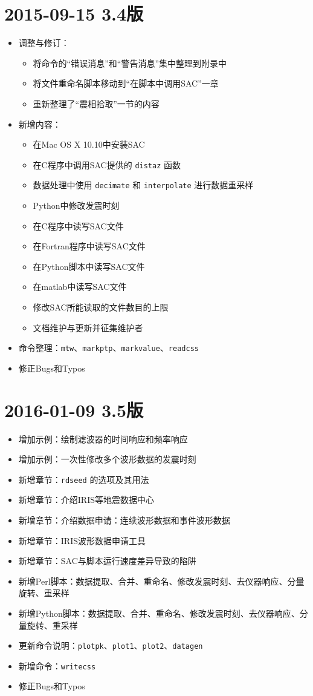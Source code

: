 \section*{2015-09-15 3.4版}
\begin{itemize}
\item 调整与修订：
    \begin{itemize}
    \item 将命令的``错误消息''和``警告消息''集中整理到附录中
    \item 将文件重命名脚本移动到``在脚本中调用SAC''一章
    \item 重新整理了``震相拾取''一节的内容
    \end{itemize}
\item 新增内容：
    \begin{itemize}
    \item 在Mac OS X 10.10中安装SAC
    \item 在C程序中调用SAC提供的 \texttt{distaz} 函数
    \item 数据处理中使用 \texttt{decimate} 和 \texttt{interpolate} 进行数据重采样
    \item Python中修改发震时刻
    \item 在C程序中读写SAC文件
    \item 在Fortran程序中读写SAC文件
    \item 在Python脚本中读写SAC文件
    \item 在matlab中读写SAC文件
    \item 修改SAC所能读取的文件数目的上限
    \item 文档维护与更新并征集维护者
    \end{itemize}
\item 命令整理：\texttt{mtw}、\texttt{markptp}、\texttt{markvalue}、\texttt{readcss}
\item 修正Bugs和Typos
\end{itemize}

\section*{2016-01-09 3.5版}
\begin{itemize}
\item 增加示例：绘制滤波器的时间响应和频率响应
\item 增加示例：一次性修改多个波形数据的发震时刻
\item 新增章节：\texttt{rdseed} 的选项及其用法
\item 新增章节：介绍IRIS等地震数据中心
\item 新增章节：介绍数据申请：连续波形数据和事件波形数据
\item 新增章节：IRIS波形数据申请工具
\item 新增章节：SAC与脚本运行速度差异导致的陷阱
\item 新增Perl脚本：数据提取、合并、重命名、修改发震时刻、去仪器响应、分量旋转、重采样
\item 新增Python脚本：数据提取、合并、重命名、修改发震时刻、去仪器响应、分量旋转、重采样
\item 更新命令说明：\texttt{plotpk}、\texttt{plot1}、\texttt{plot2}、\texttt{datagen}
\item 新增命令：\texttt{writecss}
\item 修正Bugs和Typos
\end{itemize}
